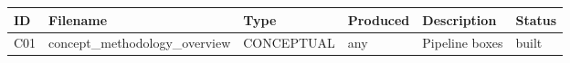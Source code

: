 \begin{tabular}{llllll}
\toprule
ID & Filename & Type & Produced & Description & Status \\
\midrule
C01 & concept_methodology_overview & CONCEPTUAL & any & Pipeline boxes & built \\
\bottomrule
\end{tabular}
